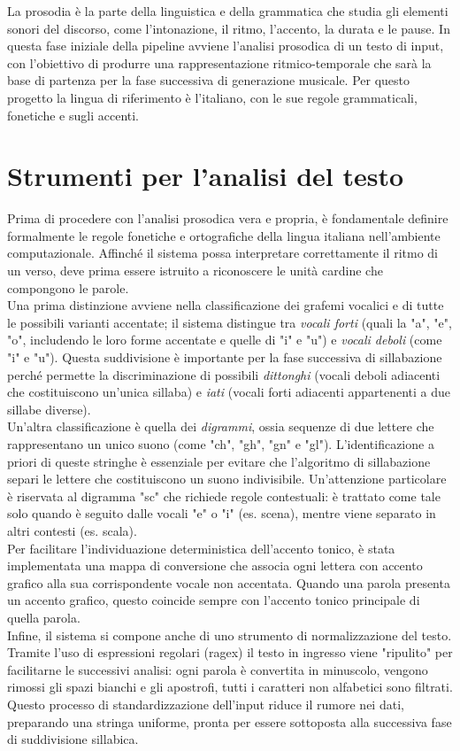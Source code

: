 La prosodia è la parte della linguistica e della grammatica che studia gli elementi sonori del discorso, come l'intonazione, il ritmo, l'accento, 
la durata e le pause. In questa fase iniziale della pipeline avviene l'analisi prosodica di un testo di input, con l'obiettivo di produrre 
una rappresentazione ritmico-temporale che sarà la base di partenza per la fase successiva di generazione musicale. 
Per questo progetto la lingua di riferimento è l'italiano, con le sue regole grammaticali, fonetiche e sugli accenti. 

\section{Strumenti per l'analisi del testo}
Prima di procedere con l'analisi prosodica vera e propria, è fondamentale definire formalmente le regole fonetiche e ortografiche della lingua italiana
nell'ambiente computazionale. Affinché il sistema possa interpretare correttamente il ritmo di un verso, deve prima essere istruito a riconoscere 
le unità cardine che compongono le parole.\\
Una prima distinzione avviene nella classificazione dei grafemi vocalici e di tutte le possibili varianti accentate; il sistema distingue tra 
\textit{vocali forti} (quali la "a", "e", "o", includendo le loro forme accentate e quelle di "i" e "u") e \textit{vocali deboli} (come "i" e "u"). 
Questa suddivisione è importante per la fase successiva di sillabazione perché permette la discriminazione di possibili \textit{dittonghi} (vocali deboli 
adiacenti che costituiscono un'unica sillaba) e \textit{iati} (vocali forti adiacenti appartenenti a due sillabe diverse).\\
Un'altra classificazione è quella dei \textit{digrammi}, ossia sequenze di due lettere che rappresentano un unico suono (come "ch", "gh", "gn" e "gl"). 
L'identificazione a priori di queste stringhe è essenziale per evitare che l'algoritmo di sillabazione separi le lettere che costituiscono un suono 
indivisibile. Un'attenzione particolare è riservata al digramma "sc" che richiede regole contestuali: è trattato come tale solo quando è seguito dalle 
vocali "e" o "i" (es. scena), mentre viene separato in altri contesti (es. scala).\\
Per facilitare l'individuazione deterministica dell'accento tonico, è stata implementata una mappa di conversione che 
associa ogni lettera con accento grafico alla sua corrispondente vocale non accentata. Quando una parola presenta un accento grafico, questo coincide 
sempre con l'accento tonico principale di quella parola.\\
Infine, il sistema si compone anche di uno strumento di normalizzazione del testo. Tramite l'uso di espressioni regolari (ragex) 
il testo in ingresso viene "ripulito" per facilitarne le successivi analisi: ogni parola è convertita in minuscolo, vengono rimossi gli spazi bianchi e 
gli apostrofi, tutti i caratteri non alfabetici sono filtrati. Questo processo di standardizzazione dell'input riduce il rumore nei dati, preparando una 
stringa uniforme, pronta per essere sottoposta alla successiva fase di suddivisione sillabica.

